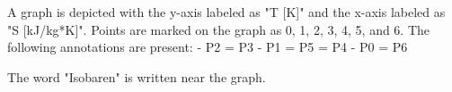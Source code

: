 A graph is depicted with the y-axis labeled as "T [K]" and the x-axis labeled as "S [kJ/kg*K]". Points are marked on the graph as 0, 1, 2, 3, 4, 5, and 6. The following annotations are present:
- P2 = P3
- P1 = P5 = P4
- P0 = P6

The word "Isobaren" is written near the graph.